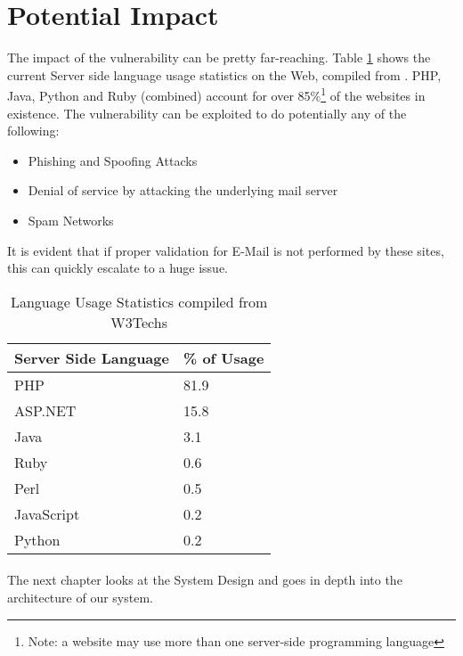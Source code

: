 \section{Potential Impact}

The impact of the vulnerability can be pretty far-reaching.
Table \ref{tab:usage} shows the current Server side language usage statistics on the Web, compiled from \cite{W3techs}. 
PHP, Java, Python and Ruby (combined) account for over 85\%\footnote{Note: a website may use more than one server-side programming language} of the websites in existence. The vulnerability can be exploited to do potentially any of the following:
\begin{itemize}
	\item Phishing and Spoofing Attacks
	\item Denial of service by attacking the underlying mail server
	\item Spam Networks
\end{itemize}

It is evident that if proper validation for E-Mail is not performed by these sites, this can quickly escalate to a huge issue.


\begin{table}[!htbp]
	\centering
	\begin{tabular}{|p{4cm}|p{4cm}|}
		\hline
		Server Side Language & \% of Usage\\
		\hline
		PHP & 81.9\\
		\hline    
		ASP.NET    & 15.8\\
		\hline
		Java & 3.1\\
		\hline
		Ruby &     0.6\\
		\hline
		Perl &    0.5\\
		\hline
		JavaScript & 0.2\\
		\hline
		Python & 0.2\\
		\hline
		
	\end{tabular}
	\caption{Language Usage Statistics compiled from W3Techs}
	\label{tab:usage}
\end{table}

\paragraph{}
The next chapter looks at the System Design and goes in depth into the architecture of our system.
